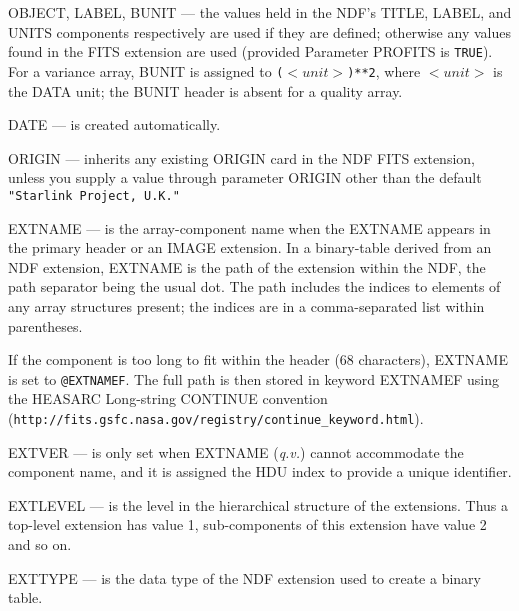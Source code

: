 \documentclass[twoside,11pt]{article}
\newcommand{\sstitem}{\item}
\newcommand{\sstitem}{\item}
\begin{document}
{{{{            \sstitem
            OBJECT, LABEL, BUNIT --- the values held in the NDF's TITLE,
              LABEL, and UNITS components respectively are used if
              they are defined; otherwise any values found in the FITS
              extension are used (provided Parameter PROFITS is \texttt{TRUE}).
              For a variance array, BUNIT is assigned to 
              \texttt{($<unit>$)**2}, where $<unit>$ is the DATA unit; the
              BUNIT header is absent for a quality array.

            \sstitem
            DATE --- is created automatically.

            \sstitem
            ORIGIN --- inherits any existing ORIGIN card in the NDF FITS
              extension, unless you supply a value through parameter
              ORIGIN other than the default \texttt{"Starlink Project, U.K."}

            \sstitem
            EXTNAME --- is the array-component name when the EXTNAME
              appears in the primary header or an IMAGE extension.  In a
              binary-table derived from an NDF extension, EXTNAME is the
              path of the extension within the NDF, the path separator
              being the usual dot.  The path includes the indices to
              elements of any array structures present; the indices are in
              a comma-separated list within parentheses.

              If the component is too long to fit within the header 
              (68 characters), EXTNAME is set to  \texttt{@EXTNAMEF}.  The 
              full  path is then stored in keyword EXTNAMEF using the HEASARC 
              Long-string CONTINUE convention \goodbreak
              (\texttt{http://fits.gsfc.nasa.gov/registry/continue\_keyword.html}).

            \sstitem
            EXTVER --- is only set when EXTNAME ({\em{q.v.}}) cannot accommodate
              the component name, and it is assigned the HDU index to provide a
              unique identifier.
            
            \sstitem
            EXTLEVEL --- is the level in the hierarchical structure of the
              extensions.  Thus a top-level extension has value 1,
              sub-components of this extension have value 2 and so on.

            \sstitem
            EXTTYPE --- is the data type of the NDF extension used to
              create a binary table.

}}}}
\end{document}
